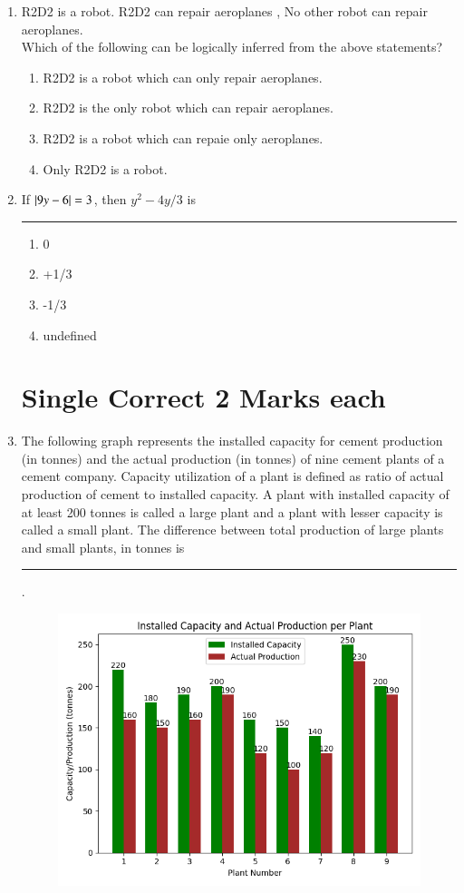 \documentclass[journal]{IEEEtran}
\begin{document}
\begin{enumerate}
\item R2D2 is a robot. R2D2 can repair aeroplanes , No other robot can repair aeroplanes.\\
Which of the following can be logically inferred from the above statements?
\begin{multicols}{2}
    \begin{enumerate}
        \item R2D2 is a robot which can only repair aeroplanes.
        \item R2D2 is the only robot which can repair aeroplanes.
        \item R2D2 is a robot which can repaie only aeroplanes.
        \item Only R2D2 is a robot.
    \end{enumerate}
\end{multicols}

\item If $\left\vert9y - 6\right\vert = 3$, then $y^2 - 4y/3$ is \rule{1cm}{0.15mm}
\begin{multicols}{2}
    \begin{enumerate}
        \item 0
        \item +1/3
        \item -1/3
        \item undefined
    \end{enumerate}
\end{multicols}

\section*{Single Correct 2 Marks each}
\item The following graph represents the installed capacity for cement production (in tonnes) and the
actual production (in tonnes) of nine cement plants of a cement company. Capacity utilization of a
plant is defined as ratio of actual production of cement to installed capacity. A plant with installed
capacity of at least 200 tonnes is called a large plant and a plant with lesser capacity is called a
small plant. The difference between total production of large plants and small plants, in tonnes is \rule{1cm}{0.15mm}.
\begin{figure}
    \centering
    \includegraphics[width=0.5\linewidth]{figs/figure.png}
    \label{fig:enter-label}
\end{figure}


\end{enumerate}
\end{document}
